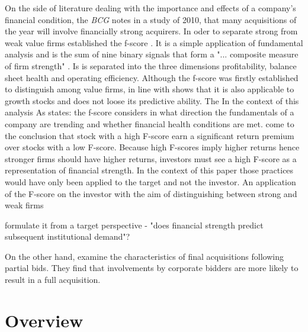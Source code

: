 \documentclass[12pt]{article}
\begin{document}
On the side of literature dealing with the importance and effects of a company's financial condition, the \emph{BCG} notes in a study of 2010, that many acquisitions of the year will involve financially strong acquirers. In oder to separate strong from weak value firms \citet{Piotroski2000} established the f-score . It is a simple application of fundamental analysis and is the sum of nine binary signals that form a "... composite measure of firm strength" \citep[p. 496]{Fama2006}. Is is separated into the three dimensions profitability, balance sheet health and operating efficiency. Although the f-score was firstly established to distinguish among value firms, \citet{Mohr2012} in line with \citet{Piotroski2000} shows that it is also applicable to growth stocks and does not loose its predictive ability. The  In the context of this analysis As \citet{Mohr2012} states: the f-score considers in what direction the fundamentals of a company are trending and whether financial health conditions are met. \citet{Hyde2014} come to the conclusion that stock with a high F-score earn a significant return premium over stocks with a low F-score. Because high F-scores imply higher returns hence stronger firms should have higher returns, investors must see a high F-score as a representation of financial strength. In the context of this paper those practices would have only been applied to the target and not the investor. An application of the F-score on the investor with the aim of distinguishing between strong and weak firms 


\citet{Choi2012} formulate it from a target perspective - "does financial strength predict subsequent institutional demand"? 


On the other hand, \citet{Akhigbe2007} examine the characteristics of final acquisitions following partial bids. They find that involvements by corporate bidders are more likely to result in a full acquisition. 


\section{Overview}
\end{document}
